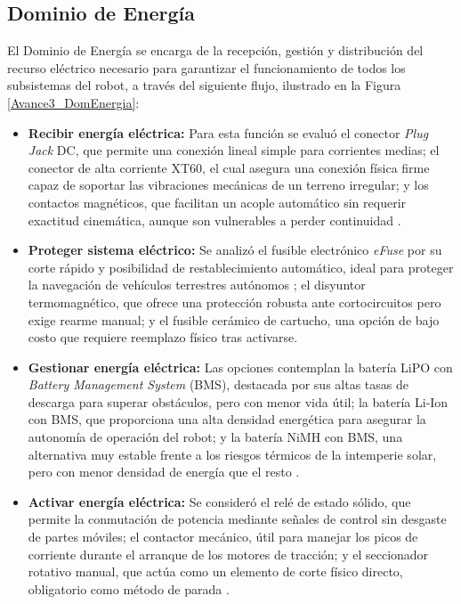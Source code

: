 \subsection{Dominio de Energía}
El Dominio de Energía se encarga de la recepción, gestión y distribución del recurso eléctrico necesario para garantizar el funcionamiento de todos los subsistemas del robot, a través del siguiente flujo, ilustrado en la Figura \ref{Avance3_DomEnergia}:

\begin{itemize}
	\item \textbf{Recibir energía eléctrica:} Para esta función se evaluó el conector \textit{Plug Jack} DC, que permite una conexión lineal simple para corrientes medias; el conector de alta corriente XT60, el cual asegura una conexión física firme capaz de soportar las vibraciones mecánicas de un terreno irregular; y los contactos magnéticos, que facilitan un acople automático sin requerir exactitud cinemática, aunque son vulnerables a perder continuidad \citep{Salinas2025}.
	
	\item \textbf{Proteger sistema eléctrico:} Se analizó el fusible electrónico \textit{eFuse} por su corte rápido y posibilidad de restablecimiento automático, ideal para proteger la navegación de vehículos terrestres autónomos \citep{CN221163061U}; el disyuntor termomagnético, que ofrece una protección robusta ante cortocircuitos pero exige rearme manual; y el fusible cerámico de cartucho, una opción de bajo costo que requiere reemplazo físico tras activarse.
	
	\item \textbf{Gestionar energía eléctrica:} Las opciones contemplan la batería LiPO con \textit{Battery Management System} (BMS), destacada por sus altas tasas de descarga para superar obstáculos, pero con menor vida útil; la batería Li-Ion con BMS, que proporciona una alta densidad energética para asegurar la autonomía de operación del robot; y la batería NiMH con BMS, una alternativa muy estable frente a los riesgos térmicos de la intemperie solar, pero con menor densidad de energía que el resto \citep{XPower2024}.
	
	\item \textbf{Activar energía eléctrica:} Se consideró el relé de estado sólido, que permite la conmutación de potencia mediante señales de control sin desgaste de partes móviles; el contactor mecánico, útil para manejar los picos de corriente durante el arranque de los motores de tracción; y el seccionador rotativo manual, que actúa como un elemento de corte físico directo, obligatorio como método de parada \citep{Burriana5MW}.
	

\end{itemize}
